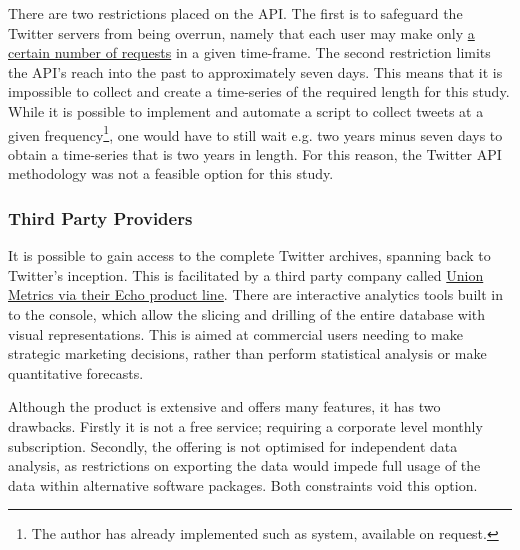 \documentclass{article}
\begin{document}
There are two restrictions placed on the API. The first is to safeguard the Twitter servers from being overrun, namely that each user may make only \href{https://dev.twitter.com/rest/public/rate-limits}{a certain number of requests} in a given time-frame. The second restriction limits the API's reach into the past to approximately seven days. This means that it is impossible to collect and create a time-series of the required length for this study. While it is possible to implement and automate a script to collect tweets at a given frequency\footnote{The author has already implemented such as system, available on request.}, one would have to still wait e.g. two years minus seven days to obtain a time-series that is two years in length. For this reason, the Twitter API methodology was not a feasible option for this study.


\subsubsection{Third Party Providers}
\label{sec-2-2-2}
It is possible to gain access to the complete Twitter archives, spanning back to Twitter's inception. This is facilitated by a third party company called \href{https://unionmetrics.com/product/echo-twitter-archive-search/}{Union Metrics via their Echo product line}. There are interactive analytics tools built in to the console, which allow the slicing and drilling of the entire database with visual representations. This is aimed at commercial users needing to make strategic marketing decisions, rather than perform statistical analysis or make quantitative forecasts.

Although the product is extensive and offers many features, it has two drawbacks. Firstly it is not a free service; requiring a corporate level monthly subscription. Secondly, the offering is not optimised for independent data analysis, as restrictions on exporting the data would impede full usage of the data within alternative software packages. Both constraints void this option.
\end{document}
